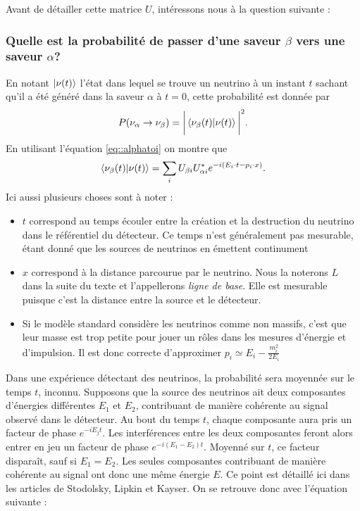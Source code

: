             Avant de détailler cette matrice $U$, intéressons nous à la question suivante : \\
            \subsubsection{Quelle est la probabilité de passer d'une saveur $\beta$ vers une saveur $\alpha$?}
            En notant $\ket{\nu(t)}$ l'état dans lequel se trouve un neutrino à un instant $t$ sachant qu'il a été généré dans la saveur $\alpha$ à $t=0$, cette probabilité est donnée par
            \begin{equation}
                P(\nu_{\alpha}\to\nu_{\beta})=\bigg|\braket{\nu_{\beta}(t)}{\nu(t)}\bigg|^2.
            \end{equation}
            En utilisant l'équation \eqref{eq::alphatoi} on montre que
            \begin{equation}
                \braket{\nu_{\beta}(t)}{\nu(t)} = \sum_i U_{\beta i}U_{\alpha i}^* e^{-i(E_i\cdot t - p_i\cdot x)}.
            \end{equation}
            Ici aussi plusieurs choses sont à noter : 
            \begin{itemize}
                \item $t$ correspond au temps écouler entre la création et la destruction du neutrino dans le référentiel du détecteur. Ce temps n'est généralement pas mesurable, étant donné que les sources de neutrinos en émettent continument
                \item $x$ correspond à la distance parcourue par le neutrino. Nous la noterons $L$ dans la suite du texte et l'appellerons \textit{ligne de base}. Elle est mesurable puisque c'est la distance entre la source et le détecteur.
                \item Si le modèle standard considère les neutrinos comme non massifs, c'est que leur masse est trop petite pour jouer un rôles dans les mesures d'énergie et d'impulsion. Il est donc correcte d'approximer $p_i \simeq E_i - \frac{m_i^2}{2E_i}$
            \end{itemize}
            Dans une expérience détectant des neutrinos, la probabilité sera moyennée sur le temps $t$, inconnu. Supposons que la source des neutrinos ait deux composantes d'énergies différentes $E_1$ et $E_2$, contribuant de manière cohérente au signal observé dans le détecteur. Au bout du temps $t$, chaque composante aura pris un facteur de phase $e^{-iE_jt}$. Les interférences entre les deux composantes feront alors entrer en jeu un facteur de phase $e^{-i(E_1-E_2)t}$. Moyenné sur $t$, ce facteur disparaît, sauf si $E_1 = E_2$. Les seules composantes contribuant de manière cohérente au signal ont donc une même énergie $E$. Ce point est détaillé ici dans les articles de Stodolsky\cite{Stodolsky1998}, Lipkin\cite{Lipkin2005} et Kayser\cite{Kayser2005}. On se retrouve donc avec l'équation suivante : 
